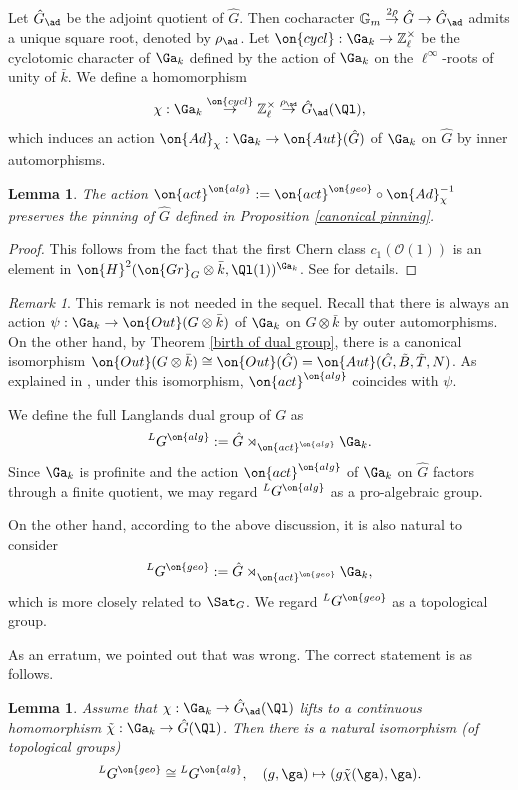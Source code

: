 \documentclass[]{pcmi}
\theoremstyle{plain}
\newtheorem{lem}[equation]{Lemma}
\theoremstyle{remark}
\newtheorem{rmk}[equation]{Remark}
\theoremstyle{definition}
\newcommand{\bG}{{\mathbb G}}
\newcommand{\bZ}{{\mathbb Z}}
\newcommand{\mO}{{\mathcal O}}
\newcommand{\Ad}{{\on{Ad}}}
\newcommand{\Aut}{{\on{Aut}}}
\newcommand{\Gr}{{\on{Gr}}}
\begin{document}
Let $\hat G_\ad$ be the adjoint quotient of $\hat G$. Then cocharacter $\bG_m\stackrel{2\rho}{\to} \hat G\to \hat G_\ad$ admits a unique square root, denoted by $\rho_\ad$.
Let $\on{cycl}:\Ga_k\to\bZ_\ell^\times$
be the cyclotomic character of $\Ga_k$ defined by the action of
$\Ga_k$ on the $\ell^\infty$-roots of unity of $\bar k$.  We define a homomorphism
\[\chi:\Ga_k\stackrel{\on{cycl}}{\to} \bZ_\ell^\times\stackrel{\rho_\ad}{\to} \hat G_{\ad}(\Ql),\]
which induces an action $\Ad_{\chi}:\Ga_k\to\Aut(\hat G)$ of $\Ga_k$ on 
$\hat G$ by inner automorphisms. 
\begin{lem}\label{comparison}The action $\on{act}^{\on{alg}}:=\on{act}^{\on{geo}}\circ \Ad^{-1}_{\chi}$ preserves the pinning of $\hat G$ defined in Proposition \ref{canonical pinning}.
\end{lem}
\begin{proof}This follows from the fact that the first Chern class $c_1(\mO(1))$ is an element in $\on{H}^2(\Gr_G\otimes\bar k, \Ql(1))^{\Ga_k}$. See \cite[Proposition A.6]{RZ} for details.
\end{proof}
\begin{rmk}
This remark is not needed in the sequel. Recall that there is always an action $\psi: \Ga_k\to \on{Out}(G\otimes \bar k)$ of $\Ga_k$ on $G\otimes \bar k$ by outer automorphisms. On the other hand,
by Theorem \ref{birth of dual group}, there is a canonical isomorphism $\on{Out}(G\otimes\bar k)\cong \on{Out}(\hat G)=\Aut(\hat G, \tilde B, \tilde T, N)$. As explained in \cite{RZ}, under this isomorphism, $\on{act}^{\on{alg}}$ coincides with $\psi$. 
\end{rmk}
We define the full Langlands dual group of $G$ as
\[{^L}G^{\on{alg}}:= \hat G\rtimes_{\on{act}^{\on{alg}}}\Ga_k.\]
Since $\Ga_k$ is profinite and the action $\on{act}^{\on{alg}}$ of $\Ga_k$ on $\hat G$ factors through a finite quotient, we may regard ${^L}G^{\on{alg}}$ as a pro-algebraic group.

On the other hand, according to the above discussion, it is also natural to consider
\[{^L}G^{\on{geo}}:= \hat G\rtimes_{\on{act}^{\on{geo}}}\Ga_k,\]
which is more closely related to $\Sat_G$. We regard ${^L}G^{\on{geo}}$ as a topological group.

As an erratum, we pointed out that \cite[Corollary A.8]{RZ} was wrong. The correct statement is as follows.
\begin{lem}\label{geom Langlands dual}
Assume that $\chi: \Ga_k\to \hat G_\ad(\Ql)$ lifts to a continuous homomorphism $\tilde \chi:\Ga_k\to \hat G(\Ql)$. Then there is a natural isomorphism (of topological groups)
\[{^L}G^{\on{geo}}\cong{^L}G^{\on{alg}},\quad (g,\ga)\mapsto (g\tilde\chi(\ga),\ga).\]
\end{lem}
\end{document}
